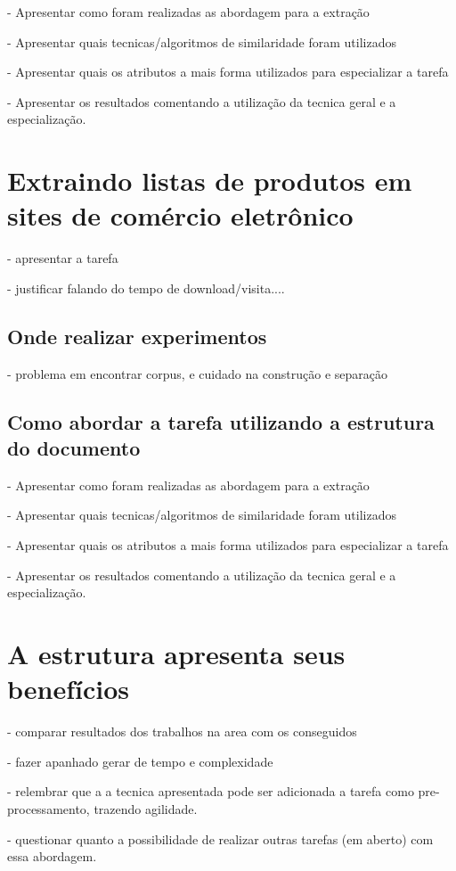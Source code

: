 \documentclass{acm_proc_article-sp}
\numberwithin{equation}{section}
\begin{document}
- Apresentar como foram realizadas as abordagem para a extração

- Apresentar quais tecnicas/algoritmos de similaridade foram utilizados

- Apresentar quais os atributos a mais forma utilizados para especializar a tarefa

- Apresentar os resultados comentando a utilização da tecnica geral e a especialização.


\section{Extraindo listas de produtos em sites de comércio eletrônico}

- apresentar a tarefa

- justificar falando do tempo de download/visita....

\subsection{Onde realizar experimentos}

- problema em encontrar corpus, e cuidado na construção e separação

\subsection{Como abordar a tarefa utilizando a estrutura do documento}

- Apresentar como foram realizadas as abordagem para a extração

- Apresentar quais tecnicas/algoritmos de similaridade foram utilizados

- Apresentar quais os atributos a mais forma utilizados para especializar a tarefa

- Apresentar os resultados comentando a utilização da tecnica geral e a especialização.


\section{A estrutura apresenta seus benefícios}

- comparar resultados dos trabalhos na area com os conseguidos

- fazer apanhado gerar de tempo e complexidade

- relembrar que a a tecnica apresentada pode ser adicionada a tarefa como pre-processamento, trazendo agilidade.

- questionar quanto a possibilidade de realizar outras tarefas (em aberto) com essa abordagem.
\end{document}
